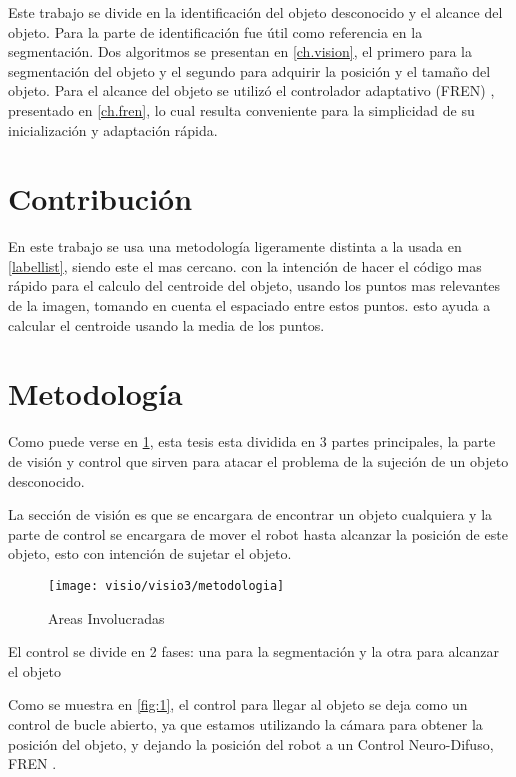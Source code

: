 Este trabajo se divide en la identificación del objeto desconocido y el alcance del objeto. Para la parte de identificación \cite{hosang2016makes} fue útil como referencia en la segmentación. Dos algoritmos se presentan en \cref{ch.vision}, el primero para la segmentación del objeto y el segundo para adquirir la posición y el tamaño del objeto.
Para el alcance del objeto se utilizó el controlador adaptativo (FREN) \cite{fren}, presentado en \cref{ch.fren}, lo cual resulta conveniente para la simplicidad de su inicialización y adaptación rápida.

\section{Contribución}
En este trabajo se usa una metodología ligeramente distinta a la usada en \cref{labellist},  siendo este el mas cercano.
con la intención de hacer el código mas rápido para el calculo del centroide del objeto, usando los puntos mas relevantes de la imagen, tomando en cuenta el espaciado entre estos puntos.
esto ayuda a calcular el centroide usando la media de los puntos.

\section{Metodología}

Como puede verse en \cref{fig:metodologia}, esta tesis esta dividida en 3 partes principales, la parte de visión y control que sirven para atacar el problema de la sujeción de un objeto desconocido.

La sección de visión es que se encargara de encontrar un objeto cualquiera y la parte de control se encargara de mover el robot hasta alcanzar la posición de este objeto, esto con intención de sujetar el objeto.

\begin{figure}[h]
	\centering
	\texttt{[image: visio/visio3/metodologia]}
	\caption{Areas Involucradas}
	\label{fig:metodologia}
\end{figure}

El control se divide en 2 fases: una para la segmentación y la otra para alcanzar el objeto

Como se muestra en \cref{fig:1}, el control para llegar al objeto se deja como un control de bucle abierto, ya que estamos utilizando la cámara para obtener la posición del objeto, y dejando la posición del robot a un Control Neuro-Difuso, FREN \cite{fren}.

